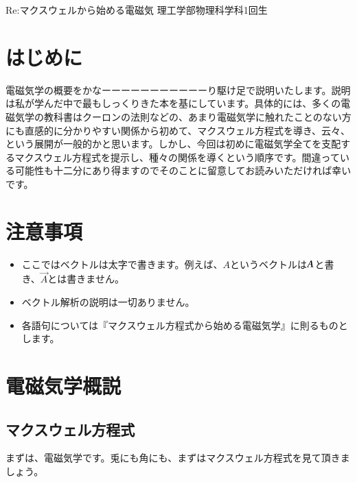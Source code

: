 \documentclass[10pt,b5paper,papersize,dvipdfmx]{jsbook}
\begin{document}


\kaishititle%
  {Re:マクスウェルから始める電磁気}%
  {理工学部物理科学科1回生}%
  {}%

\section*{はじめに}
電磁気学の概要をかなーーーーーーーーーーーり駆け足で説明いたします。説明は私が学んだ中で最もしっくりきた本を基にしています。具体的には、多くの電磁気学の教科書はクーロンの法則などの、あまり電磁気学に触れたことのない方にも直感的に分かりやすい関係から初めて、マクスウェル方程式を導き、云々、という展開が一般的かと思います。しかし、今回は初めに電磁気学全てを支配するマクスウェル方程式を提示し、種々の関係を導くという順序です。間違っている可能性も十二分にあり得ますのでそのことに留意してお読みいただければ幸いです。

\section{注意事項}
\begin{itemize}
  \item ここではベクトルは太字で書きます。例えば、$A$というベクトルは$\vb*{A}$と書き、$\vec{A}$とは書きません。
  \item ベクトル解析の説明は一切ありません。
  \item 各語句については『マクスウェル方程式から始める電磁気学』に則るものとします。
\end{itemize}

\section{電磁気学概説}

\subsection{マクスウェル方程式}
まずは、電磁気学です。兎にも角にも、まずはマクスウェル方程式を見て頂きましょう。
\end{document}
